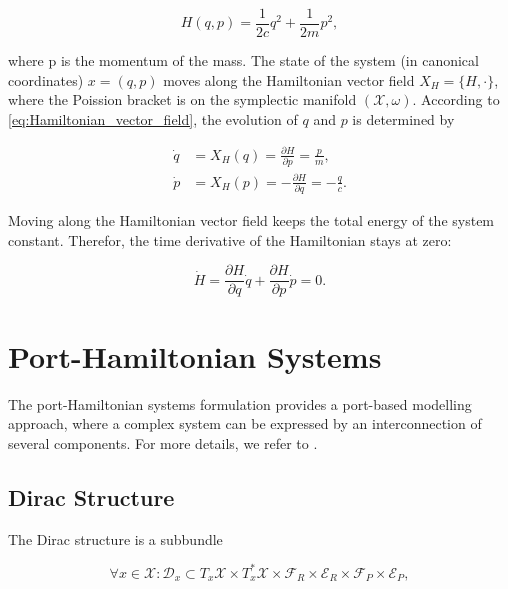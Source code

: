 \documentclass[
	parskip, 			   %
	twoside, 			   %
	DIV=14, 			   %
	BCOR=15.0mm, 		   %
	headsepline, 		   %
	open=right, 		   %
	captions=tableheading, %
	bibliography=totoc,    %
	numbers=noenddot       %
]{scrreprt}
\begin{document}
\begin{equation}
    \label{eq:Hamiltonian_udho}
    H(q,p)=\frac{1}{2c}q^2+\frac{1}{2m}p^2,
\end{equation}

where p is the momentum of the mass. The state of the system (in canonical coordinates) $x=(q,p)$ moves along the Hamiltonian vector field $X_{H}=\{H, \cdot\}$, where the Poission bracket is on the symplectic manifold $(\mathcal{X},\omega)$. According to \ref{eq:Hamiltonian_vector_field}, the evolution of $q$ and $p$ is determined by

\begin{equation}
    \label{eq:ODE_undamped_harmonic_oscillator}
    \begin{aligned}
        \dot{q}&=X_{H}(q)=\frac{\partial H}{\partial p}=\frac{p}{m},\\
        \dot{p}&=X_{H}(p)=-\frac{\partial H}{\partial q}=-\frac{q}{c}.
    \end{aligned}
\end{equation}

Moving along the Hamiltonian vector field keeps the total energy of the system constant. Therefor, the time derivative of the Hamiltonian stays at zero:

\begin{equation}
    \label{eq:derivative_Hamiltonian}
    \dot{H}=\frac{\partial H}{\partial q}\dot{q}+\frac{\partial H}{\partial p}\dot{p}=0.
\end{equation}


\section{Port-Hamiltonian Systems}
The port-Hamiltonian systems formulation provides a port-based modelling approach, where a complex system can be expressed by an interconnection of several components. For more details, we refer to \cite{van2014port}.

\subsection{Dirac Structure}
The Dirac structure is a subbundle

\begin{equation}
    \label{eq:Dirac_structure}
    \forall x \in \mathcal{X}: \mathcal{D}_x \subset T_{x}\mathcal{X} \times T_{x}^{*}\mathcal{X} \times \mathcal{F}_R \times \mathcal{E}_R \times \mathcal{F}_P \times \mathcal{E}_P,
\end{equation}
\end{document}

